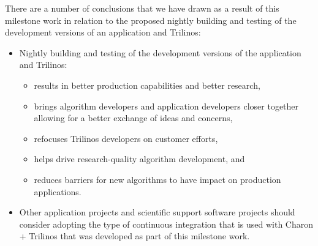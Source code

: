 \documentclass[pdf,ps2pdf,11pt]{SANDreport}
\begin{document}
There are a number of conclusions that we have drawn as a result of this
milestone work in relation to the proposed nightly building and testing of the
development versions of an application and Trilinos:

\begin{itemize}

{}\item Nightly building and testing of the development versions of the
application and Trilinos:

  \begin{itemize}

  {}\item results in better production capabilities and better research,

  {}\item brings algorithm developers and application developers closer
  together allowing for a better exchange of ideas and concerns,

  {}\item refocuses Trilinos developers on customer efforts,

  {}\item helps drive research-quality algorithm development, and
        
  {}\item reduces barriers for new algorithms to have impact on production
  applications.

  \end{itemize}

{}\item Other application projects and scientific support software projects
should consider adopting the type of continuous integration that is used with
Charon + Trilinos that was developed as part of this milestone work.

\end{itemize}

%
\clearpage



%
%

\end{document}

